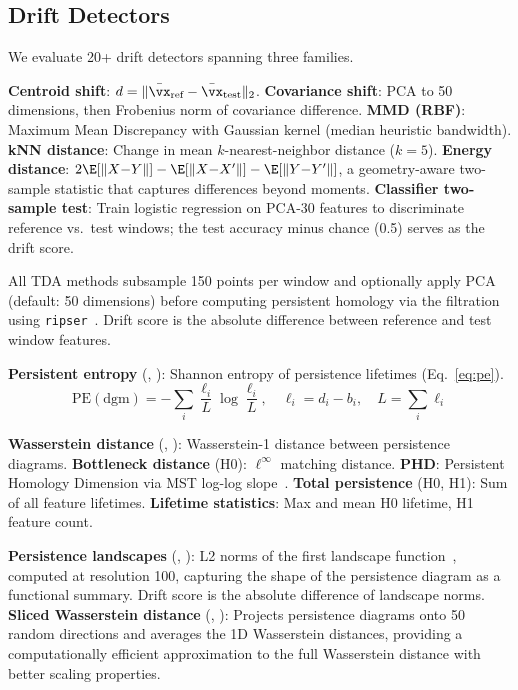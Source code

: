 \subsection{Drift Detectors}
\label{sec:detectors}

We evaluate 20+ drift detectors spanning three families.

\textbf{Centroid shift}: $d = \|\bar{\vx}_{\text{ref}} - \bar{\vx}_{\text{test}}\|_2$.
\textbf{Covariance shift}: PCA to 50 dimensions, then Frobenius norm of covariance difference.
\textbf{MMD (RBF)}: Maximum Mean Discrepancy with Gaussian kernel (median heuristic bandwidth).
\textbf{kNN distance}: Change in mean $k$-nearest-neighbor distance ($k{=}5$).
\textbf{Energy distance}: $2\E[\|X{-}Y\|] - \E[\|X{-}X'\|] - \E[\|Y{-}Y'\|]$, a geometry-aware two-sample statistic that captures differences beyond moments.
\textbf{Classifier two-sample test}: Train logistic regression on PCA-30 features to discriminate reference vs.\ test windows; the test accuracy minus chance (0.5) serves as the drift score.

All TDA methods subsample 150 points per window and optionally apply PCA (default: 50 dimensions) before computing persistent homology via the \vrfilt filtration using \texttt{ripser}~\cite{tralie2019ripser}. Drift score is the absolute difference between reference and test window features.

\textbf{Persistent entropy} (, ): Shannon entropy of persistence lifetimes (Eq.~\ref{eq:pe}).
\begin{equation}
    \text{PE}(\text{dgm}) = -\sum_{i} \frac{\ell_i}{L} \log \frac{\ell_i}{L}, \quad \ell_i = d_i - b_i, \quad L = \sum_i \ell_i
    \label{eq:pe}
\end{equation}

\textbf{Wasserstein distance} (, ): Wasserstein-1 distance between persistence diagrams.
\textbf{Bottleneck distance} (H0): $\ell^\infty$ matching distance.
\textbf{PHD}: Persistent Homology Dimension via MST log-log slope~\cite{wei2025shortphd}.
\textbf{Total persistence} (H0, H1): Sum of all feature lifetimes.
\textbf{Lifetime statistics}: Max and mean H0 lifetime, H1 feature count.

\textbf{Persistence landscapes} (, ): L2 norms of the first landscape function~\cite{bubenik2015statistical}, computed at resolution 100, capturing the shape of the persistence diagram as a functional summary. Drift score is the absolute difference of landscape norms.
\textbf{Sliced Wasserstein distance} (, ): Projects persistence diagrams onto 50 random directions and averages the 1D Wasserstein distances, providing a computationally efficient approximation to the full Wasserstein distance with better scaling properties.

